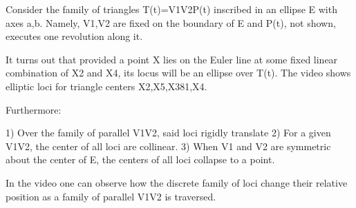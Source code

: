 Consider the family of triangles T(t)=V1V2P(t) inscribed in an ellipse E with axes a,b. Namely, V1,V2 are fixed on the boundary of E and P(t), not shown, executes one revolution along it.

It turns out that provided a point X lies on the Euler line at some fixed linear combination of X2 and X4, its locus will be an ellipse over T(t). The video shows elliptic loci for triangle centers X2,X5,X381,X4.

Furthermore:

1) Over the family of parallel V1V2, said loci rigidly translate
2) For a given V1V2, the center of all loci are collinear.
3) When V1 and V2 are symmetric about the center of E, the centers of all loci collapse to a point.

In the video one can observe how the discrete family of loci change their relative position as a family of parallel V1V2 is traversed.